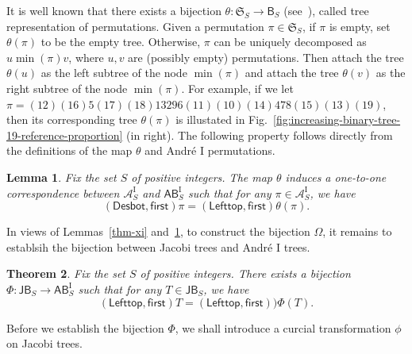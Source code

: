 \documentclass[12pt]{article}
\numberwithin{equation}{section}
\theoremstyle{plain}
\newtheorem{theorem}{Theorem}[section]
\newtheorem{lemma}[theorem]{Lemma}
\def\B{\mathsf{B}}
\def\AB{\mathsf{AB}}
\def\Desbot{\mathsf{Desbot}}
\def\JB{\mathsf{JB}}
\def\first{\mathsf{first}}
\def\Lefttop{\mathsf{Lefttop}}
\begin{document}
   
   
   
    
     It is well known that there exists a bijection $\theta: \mathfrak{S}_S\rightarrow \B_S$ (see~\cite[Chapter 1]{ST}), called tree representation of permutations. Given a permutation $\pi\in \mathfrak{S}_S$, if   $\pi$ is empty, set $\theta(\pi)$ to be the empty tree.   Otherwise,  $\pi$ can be uniquely decomposed as $u\min(\pi) v$, where $u,v$ are (possibly empty)   permutations. Then attach the tree $\theta(u)$ as the left subtree of the node $\min(\pi)$ and attach the tree $\theta(v)$ as  the right subtree of the node $\min(\pi)$.  For example,  if we let $\pi=  (12)(16)5(17)(18)13296(11)(10)(14)478(15)(13)(19)
    $, then its corresponding tree $\theta(\pi)$ is illustated in Fig.~\ref{fig:increasing-binary-tree-19-reference-proportion} (in right). 
   The following property follows directly from the definitions of the map $\theta$ and Andr\'e $\mathrm{I}$ permutations.
   
    \begin{lemma}\label{thm-theta}
   	Fix the set $S$ of positive integers. The map $\theta$ induces  a one-to-one correspondence    between     $ \mathcal{A}^{\mathrm{I}}_{S}$ and $\AB^{\mathrm{I}}_S$ such that   for any $\pi\in \mathcal{A}^{\mathrm{I}}_S$, we have 
   	\begin{equation}\label{eq-theta}
   		(\Desbot, \first)\pi=(\Lefttop, \first)\theta(\pi).
   	\end{equation}
   \end{lemma}
   
    
   In views of Lemmas~\ref{thm-xi} and~\ref{thm-theta},  to construct the bijection $\Omega$, it remains to establsih the bijection between Jacobi trees and Andr\'e $\mathrm{I}$ trees. 
    \begin{theorem}\label{thm-Phi}
    	Fix  the set $S$ of positive integers. There exists a bijection $\Phi: \JB_S \rightarrow \AB^{\mathrm{I}}_S$ such that for any $T\in \JB_S$, we have 
    	\begin{equation}\label{eq-Phi}
    		(\Lefttop,   \first)T=(\Lefttop,   \first))\Phi(T).
    		\end{equation}
    	\end{theorem}
    	
    	
    	  
    
 Before we establish the bijection $\Phi$, we shall introduce a curcial transformation $\phi$ on Jacobi trees.
     
\end{document}
